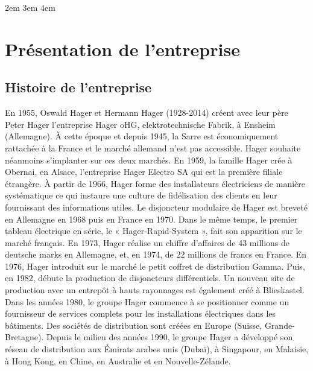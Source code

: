 \documentclass[a4paper,11pt]{article}
\begin{document}
    \cftsecnumwidth 2em   %
    \cftsubsecnumwidth 3em %
    \cftsubsubsecnumwidth 4em %
    \tableofcontents
    \newpage
    \setlength{\cftbeforefigskip}{10pt} 
    \listoffigures
    \newpage
    \renewcommand{\lstlistlistingname}{Blocs de code}
    \lstlistoflistings
    \newpage

    \noindent

    \section{Présentation de l'entreprise}
    \vspace{0.3cm}
    \subsection{Histoire de l'entreprise}
    En 1955, Oswald Hager et Hermann Hager (1928-2014) créent avec leur père Peter Hager l’entreprise Hager oHG, elektrotechnische Fabrik, à Ensheim (Allemagne). À cette époque et depuis 1945, la Sarre est économiquement rattachée à la France et le marché allemand n'est pas accessible. Hager souhaite néanmoins s'implanter sur ces deux marchés.\newline
    \vspace{0.5cm}
    \newline
    En 1959, la famille Hager crée à Obernai, en Alsace, l’entreprise Hager Electro SA qui est la première filiale étrangère. À partir de 1966, Hager forme des installateurs électriciens de manière systématique ce qui instaure une culture de fidélisation des clients en leur fournissant des informations utiles. Le disjoncteur modulaire de Hager est breveté en Allemagne en 1968 puis en France en 1970. Dans le même temps, le premier tableau électrique en série, le « Hager-Rapid-System », fait son apparition sur le marché français. En 1973, Hager réalise un chiffre d'affaires de 43 millions de deutsche marks en Allemagne, et, en 1974, de 22 millions de francs en France.
    \vspace{0.5cm}
    \newline
    En 1976, Hager introduit sur le marché le petit coffret de distribution Gamma. Puis, en 1982, débute la production de disjoncteurs différentiels. Un nouveau site de production avec un entrepôt à hauts rayonnages est également créé à Blieskastel. Dans les années 1980, le groupe Hager commence à se positionner comme un fournisseur de services complets pour les installations électriques dans les bâtiments. Des sociétés de distribution sont créées en Europe (Suisse, Grande-Bretagne). Depuis le milieu des années 1990, le groupe Hager a développé son réseau de distribution aux Émirats arabes unis (Dubaï), à Singapour, en Malaisie, à Hong Kong, en Chine, en Australie et en Nouvelle-Zélande.
\end{document}
